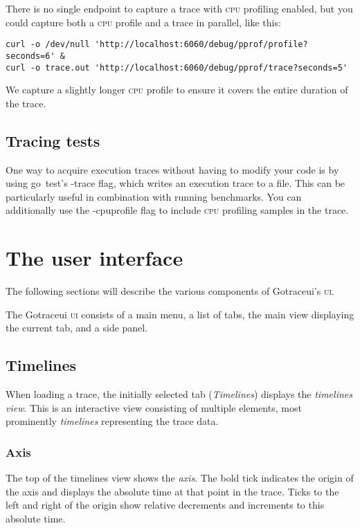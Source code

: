 \documentclass[10pt,letterpaper,oneside,openany,english]{memoir}
\newcommand{\code}[1]{{\ttfamily\mbox{#1}}}
\newcommand{\noun}[1]{{\emph{#1}}}
\begin{document}
There is no single endpoint to capture a trace with \textsc{cpu} profiling enabled, but you could capture both a \textsc{cpu} profile and a trace in parallel, like this:

\begin{verbatim}
curl -o /dev/null 'http://localhost:6060/debug/pprof/profile?seconds=6' &
curl -o trace.out 'http://localhost:6060/debug/pprof/trace?seconds=5'
\end{verbatim}

We capture a slightly longer \textsc{cpu} profile to ensure it covers the entire duration of the trace.

\section{Tracing tests}

One way to acquire execution traces without having to modify your code is by using \code{go test}'s \code{-trace} flag, which writes an execution trace to a file.
This can be particularly useful in combination with running benchmarks.
You can additionally use the \code{-cpuprofile} flag to include \textsc{cpu} profiling samples in the trace.


\chapter{The user interface}
The following sections will describe the various components of Gotraceui's \textsc{ui}.

The Gotraceui \textsc{ui} consists of a main menu, a list of tabs, the main view displaying the current tab, and a side panel.

\section{Timelines}
When loading a trace, the initially selected tab (\emph{Timelines}) displays the \noun{timelines view}.
This is an interactive view consisting of multiple elements, most prominently \noun{timelines} representing the trace data.

\subsection{Axis}
The top of the timelines view shows the \noun{axis}.
The bold tick indicates the origin of the axis and displays the absolute time at that point in the trace.
Ticks to the left and right of the origin show relative decrements and increments to this absolute time.
\end{document}
